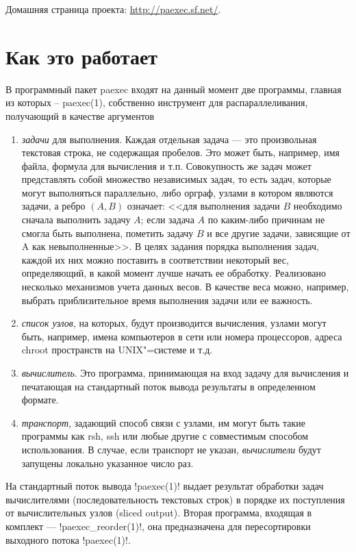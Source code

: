 \documentclass[10pt, a5paper]{article}
\begin{document}
Домашняя страница проекта: \url{http://paexec.sf.net/}.

\section*{Как это работает}
В программный пакет paexec входят на данный момент
две программы, главная из которых -- paexec(1), собственно инструмент для
распараллеливания, получающий в качестве аргументов
\begin{enumerate}
\item \emph{задачи} для выполнения. Каждая отдельная задача --- это
   произвольная текстовая строка, не содержащая пробелов. Это может
   быть, например, имя файла, формула для вычисления и
   т.п. Совокупность же задач может представлять собой множество
   независимых задач, то есть задач, которые могут выполняться
   параллельно, либо орграф, узлами в котором являются задачи, а ребро
   $(A, B)$ означает: <<для выполнения задачи $B$ необходимо сначала
   выполнить задачу $A$; если задача $A$ по каким-либо причинам не смогла
   быть выполнена, пометить задачу $B$ и все другие задачи, зависящие от
   A как невыполненные>>. В целях задания порядка выполнения задач,
   каждой их них можно поставить в соответствии некоторый вес,
   определяющий, в какой момент лучше начать ее обработку. Реализовано
   несколько механизмов учета данных весов. В качестве веса можно,
   например, выбрать приблизительное время выполнения задачи или ее
   важность.
\item \emph{список узлов}, на которых, будут производится вычисления, узлами
   могут быть, например, имена компьютеров в сети или номера процессоров,
   адреса chroot пространств на UNIX"=системе и т.д.
\item \emph{вычислитель}. Это программа, принимающая на вход задачу для
   вычисления и печатающая на стандартный поток вывода результаты в
   определенном формате.
\item \emph{транспорт}, задающий способ связи с узлами, им могут быть такие
   программы как rsh, ssh или любые другие с совместимым способом
   использования. В случае, если транспорт не указан, \emph{вычислители}
   будут запущены локально указанное число раз.
\end{enumerate}

На стандартный поток вывода \progref!paexec(1)! выдает результат обработки задач
вычислителями (последовательность текстовых \linebreak строк) в порядке их
поступления от вычислительных узлов (sliced output). Вторая программа,
входящая в комплект --- \progref!paexec\_re\-order(1)!, она предназначена для
пересортировки выходного потока \progref!paexec(1)!.
\end{document}
